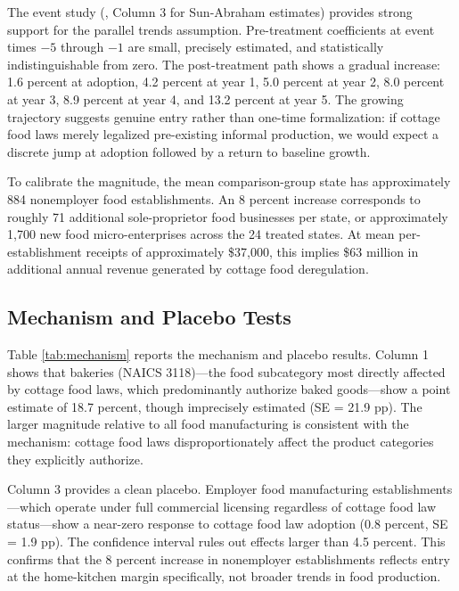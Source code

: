 \documentclass[12pt]{article}
\begin{document}
The event study (, Column 3 for Sun-Abraham estimates) provides strong support for the parallel trends assumption. Pre-treatment coefficients at event times $-5$ through $-1$ are small, precisely estimated, and statistically indistinguishable from zero. The post-treatment path shows a gradual increase: 1.6 percent at adoption, 4.2 percent at year 1, 5.0 percent at year 2, 8.0 percent at year 3, 8.9 percent at year 4, and 13.2 percent at year 5. The growing trajectory suggests genuine entry rather than one-time formalization: if cottage food laws merely legalized pre-existing informal production, we would expect a discrete jump at adoption followed by a return to baseline growth.

To calibrate the magnitude, the mean comparison-group state has approximately 884 nonemployer food establishments. An 8 percent increase corresponds to roughly 71 additional sole-proprietor food businesses per state, or approximately 1,700 new food micro-enterprises across the 24 treated states. At mean per-establishment receipts of approximately \$37,000, this implies \$63 million in additional annual revenue generated by cottage food deregulation.

\subsection{Mechanism and Placebo Tests}



Table \ref{tab:mechanism} reports the mechanism and placebo results. Column 1 shows that bakeries (NAICS 3118)---the food subcategory most directly affected by cottage food laws, which predominantly authorize baked goods---show a point estimate of 18.7 percent, though imprecisely estimated (SE = 21.9 pp). The larger magnitude relative to all food manufacturing is consistent with the mechanism: cottage food laws disproportionately affect the product categories they explicitly authorize.

Column 3 provides a clean placebo. Employer food manufacturing establishments---which operate under full commercial licensing regardless of cottage food law status---show a near-zero response to cottage food law adoption (0.8 percent, SE = 1.9 pp). The confidence interval rules out effects larger than 4.5 percent. This confirms that the 8 percent increase in nonemployer establishments reflects entry at the home-kitchen margin specifically, not broader trends in food production.
\end{document}
